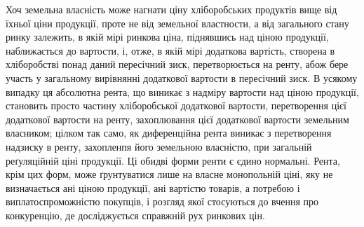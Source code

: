 Хоч земельна власність може нагнати ціну хліборобських продуктів вище
від їхньої ціни продукції, проте не від земельної властности, а від загального стану
ринку залежить, в якій мірі ринкова ціна, піднявшись над ціною продукції, наближається
до вартости, і, отже, в якій мірі додаткова вартість, створена в хліборобстві
понад даний пересічний зиск, перетворюється на ренту, абож бере участь у загальному
вирівнянні додаткової вартости в пересічний зиск. В усякому випадку
ця абсолютна рента, що виникає з надміру вартости над ціною продукції, становить
просто частину хліборобської додаткової вартости, перетворення цієї додаткової
вартости на ренту, захоплювання цієї додаткової вартости земельним власником;
цілком так само, як диференційна рента виникає з перетворення надзиску в ренту, захопленпя його
земельною власністю, при загальній реґуляційній ціні продукції. Ці обидві форми ренти є єдино
нормальні. Рента, крім цих форм, може ґрунтуватися лише на власне монопольній ціні, яку не
визначається ані ціною продукції, ані вартістю товарів, а потребою і виплатоспроможністю покупців, і
розгляд якої стосуються до вчення про конкуренцію, де досліджується справжній рух ринкових цін.
